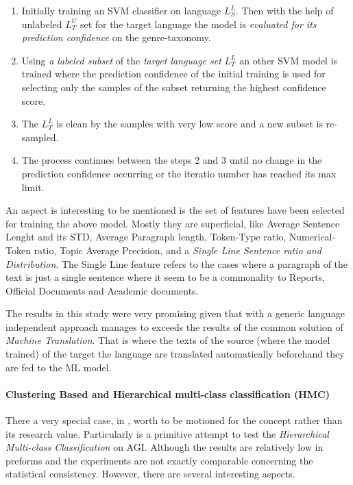 \begin{enumerate}
\item Initially training an SVM classifier on language $L^{L}_{S}$. Then with the help of unlabeled $L^{U}_{T}$ set for the target language the model is \textit{evaluated for its prediction confidence} on the genre-taxonomy.
\item Using \textit{a labeled subset} of the \textit{target language set} $L^{L}_{T}$ an other SVM model is trained where the {prediction confidence} of the initial training is used for selecting only the samples of the subset returning the highest confidence score. 
\item The $L^{L}_{T}$  is clean by the samples with very low score and a new subset is re-sampled.
\item The process continues between the steps 2 and 3 until no change in the {prediction confidence} occurring or the iteratio number has reached its max limit.
\end{enumerate}

An aspect is interesting to be mentioned is the set of features have been selected for training the above model. Mostly they are superficial, like Average Sentence Lenght and its STD, Average Paragraph length, Token-Type ratio, Numerical-Token ratio, Topic Average Precision, and a \textit{Single Line Sentence ratio and Distribution}. The Single Line feature refers to the cases where a paragraph of the text is just a single sentence where it seem to be a commonality to Reports, Official Documents and Academic documents.

The results in this study were very promising given that with a generic language independent approach manages to exceeds the results of the common solution of \textit{Machine Translation}. That is where the texts of the  source (where the model trained) of the target the language are translated automatically beforehand they are fed to the ML model.

\paragraph{Clustering Based and Hierarchical multi-class classification (HMC)} There a very special case, in \parencite{madjarov2015web}, worth to be motioned for the concept rather than its research value. Particularly is a primitive attempt to test the \textit{Hierarchical Multi-class Classification} on AGI. Although the results are relatively low in preforms and the experiments are not exactly comparable concerning the statistical consistency. However, there are several interesting aspects.

